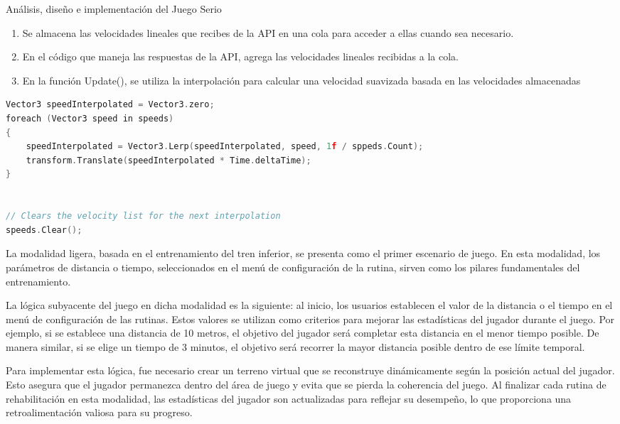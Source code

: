 \begin{thesischapter}{2} {Análisis, diseño e implementación del Juego Serio}
    \begin{enumerate}
        \item Se almacena las velocidades lineales que recibes de la API en una cola para acceder a ellas cuando sea necesario.
        \item En el código que maneja las respuestas de la API, agrega las velocidades lineales recibidas a la cola.
        \item En la función Update(), se utiliza la interpolación para calcular una velocidad suavizada basada en las velocidades almacenadas
    \end{enumerate}

\begin{center}
\begin{minipage}{0.5\textwidth}
\begin{lstlisting}[language=c, label={2}]
Vector3 speedInterpolated = Vector3.zero;
foreach (Vector3 speed in speeds)
{
    speedInterpolated = Vector3.Lerp(speedInterpolated, speed, 1f / sppeds.Count);
    transform.Translate(speedInterpolated * Time.deltaTime);
}


// Clears the velocity list for the next interpolation
speeds.Clear();
\end{lstlisting}
\end{minipage}
\end{center}


    La modalidad ligera, basada en el entrenamiento del tren inferior, se presenta como el primer escenario de juego. En esta 
    modalidad, los parámetros de distancia o tiempo, seleccionados en el menú de configuración de la rutina, sirven como los pilares 
    fundamentales del entrenamiento.

    \vspace{10pt}
    La lógica subyacente del juego en dicha modalidad es la siguiente: al inicio, los usuarios establecen el valor de la distancia o el tiempo en el menú de configuración de las rutinas. Estos valores se utilizan como criterios para mejorar las estadísticas del jugador durante el juego. Por ejemplo, si se establece una distancia de 10 metros, el objetivo del jugador será completar esta distancia en el menor tiempo posible. De manera similar, si se elige un tiempo de 3 minutos, el objetivo será recorrer la mayor distancia posible dentro de ese límite temporal.

    \vspace{10pt}
    Para implementar esta lógica, fue necesario crear un terreno virtual que se reconstruye dinámicamente según la posición actual del jugador. Esto asegura que el jugador permanezca dentro del área de juego y evita que se pierda la coherencia del juego. Al finalizar cada rutina de rehabilitación en esta modalidad, las estadísticas del jugador son actualizadas para reflejar su desempeño, lo que proporciona una retroalimentación valiosa para su progreso.


\end{thesischapter}
